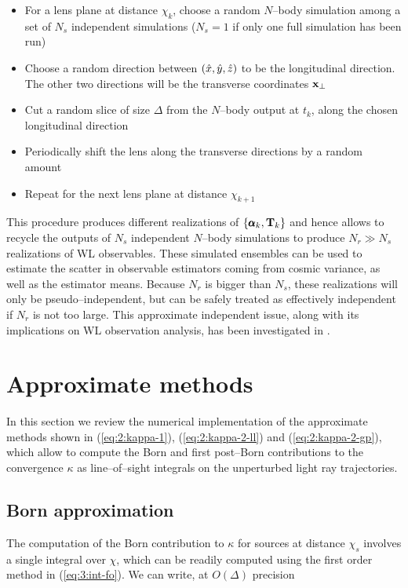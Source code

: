\begin{itemize}
\item For a lens plane at distance $\chi_k$, choose a random $N$--body simulation among a set of $N_s$ independent simulations ($N_s=1$ if only one full simulation has been run)
\item Choose a random direction between $(\hat{x},\hat{y},\hat{z})$ to be the longitudinal direction. The other two directions will be the transverse coordinates $\mathbf{x}_\perp$
\item Cut a random slice of size $\Delta$ from the $N$--body output at $t_k$, along the chosen longitudinal direction
\item Periodically shift the lens along the transverse directions by a random amount
\item Repeat for the next lens plane at distance $\chi_{k+1}$
\end{itemize}
%
This procedure produces different realizations of $\{\pmb{\alpha}_k,\mathbf{T}_k\}$ and hence allows to recycle the outputs of $N_s$ independent $N$--body simulations to produce $N_r\gg N_s$ realizations of WL observables. These simulated ensembles can be used to estimate the scatter in observable estimators coming from cosmic variance, as well as the estimator means. Because $N_r$ is bigger than $N_s$, these realizations will only be pseudo--independent, but can be safely treated as effectively independent if $N_r$ is not too large. This approximate independent issue, along with its implications on WL observation analysis, has been investigated in \citep{PetriVariance}. 


\section{Approximate methods}
In this section we review the numerical implementation of the approximate methods shown in (\ref{eq:2:kappa-1}), (\ref{eq:2:kappa-2-ll}) and (\ref{eq:2:kappa-2-gp}), which allow to compute the Born and first post--Born contributions to the convergence $\kappa$ as line--of--sight integrals on the unperturbed light ray trajectories. 

\subsection{Born approximation}
The computation of the Born contribution to $\kappa$ for sources at distance $\chi_s$ involves a single integral over $\chi$, which can be readily computed using the first order method in (\ref{eq:3:int-fo}). We can write, at $O(\Delta)$ precision 

